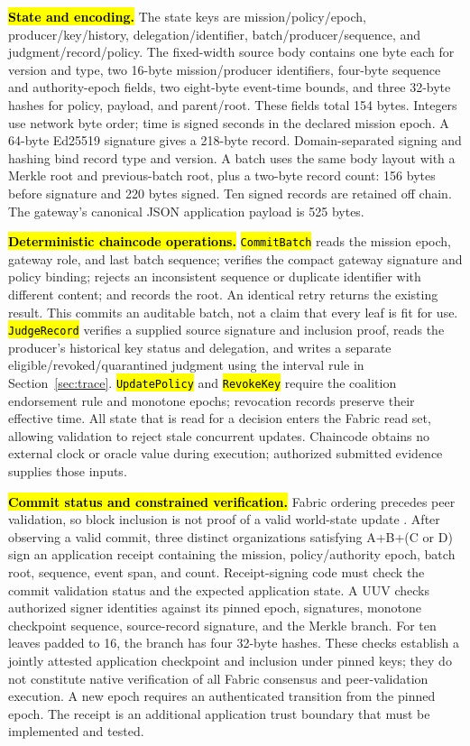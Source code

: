 \documentclass[blockchains,review,accept,moreauthors]{Definitions/mdpi}
\begin{document}
\textbf{\hl{State and encoding.}} The state keys are mission/policy/epoch, producer/key/history, delegation/identifier, batch/producer/sequence, and judgment/record/policy. The fixed-width source body contains one byte each for version and type, two 16-byte mission/producer identifiers, four-byte sequence and authority-epoch fields, two eight-byte event-time bounds, and three 32-byte hashes for policy, payload, and parent/root. These fields total 154 bytes. Integers use network byte order; time is signed seconds in the declared mission epoch. A 64-byte Ed25519 signature gives a 218-byte record. Domain-separated signing and hashing bind record type and version. A batch uses the same body layout with a Merkle root and previous-batch root, plus a two-byte record count: 156 bytes before signature and 220 bytes signed. Ten signed records are retained off chain. The gateway's canonical JSON application payload is 525 bytes.

\textbf{\hl{Deterministic chaincode operations.}} \texttt{\hl{CommitBatch}} reads the mission epoch, gateway role, and last batch sequence; verifies the compact gateway signature and policy binding; rejects an inconsistent sequence or duplicate identifier with different content; and records the root. An identical retry returns the existing result. This commits an auditable batch, not a claim that every leaf is fit for use. \texttt{\hl{JudgeRecord}} verifies a supplied source signature and inclusion proof, reads the producer's historical key status and delegation, and writes a separate eligible/revoked/quarantined judgment using the interval rule in Section~\ref{sec:trace}. \texttt{\hl{UpdatePolicy}} and \texttt{\hl{RevokeKey}} require the coalition endorsement rule and monotone epochs; revocation records preserve their effective time. All state that is read for a decision enters the Fabric read set, allowing validation to reject stale concurrent updates. Chaincode obtains no external clock or oracle value during execution; authorized submitted evidence supplies those inputs.

\textbf{\hl{Commit status and constrained verification.}} Fabric ordering precedes peer validation, so block inclusion is not proof of a valid world-state update \citep{androulaki2018hyperledger,hyperledger2026fabric}. After observing a valid commit, three distinct organizations satisfying A+B+(C or D) sign an application receipt containing the mission, policy/authority epoch, batch root, sequence, event span, and count. Receipt-signing code must check the commit validation status and the expected application state. A UUV checks authorized signer identities against its pinned epoch, signatures, monotone checkpoint sequence, source-record signature, and the Merkle branch. For ten leaves padded to 16, the branch has four 32-byte hashes. These checks establish a jointly attested application checkpoint and inclusion under pinned keys; they do not constitute native verification of all Fabric consensus and peer-validation execution. A new epoch requires an authenticated transition from the pinned epoch. The receipt is an additional application trust boundary that must be implemented and tested.
\end{document}
